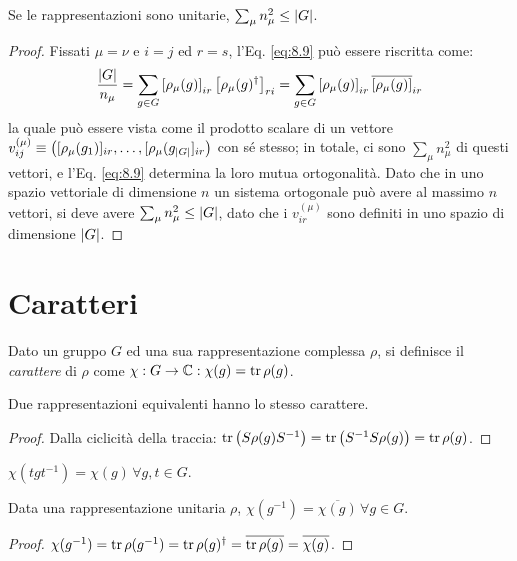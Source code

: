 \begin{corollary}\label{cond-n-mu}
	Se le rappresentazioni sono unitarie, $ \sum_{\mu} n_{\mu}^2 \le \left\lvert G\right\rvert $.
\end{corollary}
\begin{proof}
	Fissati $ \mu = \nu $ e $ i = j $ ed $ r = s $, l'Eq. \ref{eq:8.9} può essere riscritta come:
	\begin{equation*}
		\frac{\left\lvert G\right\rvert}{n_{\mu}} = \sum_{g \in G} \left[ \rho_{\mu}(g) \right]_{ir} \left[ \rho_{\mu}(g)^{\dagger} \right]_{ri} = \sum_{g \in G} \left[ \rho_{\mu}(g) \right]_{ir} \overline{\left[ \rho_{\mu}(g) \right]}_{ir}
	\end{equation*}
	la quale può essere vista come il prodotto scalare di un vettore $ v^{(\mu)}_{ij} \equiv \left( [\rho_{\mu}(g_1)]_{ir}, \dots, [\rho_{\mu}(g_{\left\lvert G\right\rvert}]_{ir} \right) $ con sé stesso; in totale, ci sono $ \sum_{\mu} n_{\mu}^2 $ di questi vettori, e l'Eq. \ref{eq:8.9} determina la loro mutua ortogonalità. Dato che in uno spazio vettoriale di dimensione $ n $ un sistema ortogonale può avere al massimo $ n $ vettori, si deve avere $ \sum_{\mu} n_{\mu}^2 \le \left\lvert G\right\rvert $, dato che i $ v^{(\mu)}_{ir} $ sono definiti in uno spazio di dimensione $ \left\lvert G\right\rvert $.
\end{proof}

\section{Caratteri}

\begin{definition}
	Dato un gruppo $ G $ ed una sua rappresentazione complessa $ \rho $, si definisce il \textit{carattere} di $ \rho $ come $ \chi : G \rightarrow \mathbb{C} : \chi(g) = \operatorname{tr}{\rho(g)} $.
\end{definition}

\begin{proposition}
	Due rappresentazioni equivalenti hanno lo stesso carattere.
\end{proposition}
\begin{proof}
	Dalla ciclicità della traccia: $ \operatorname{tr} \left( S \rho(g) S^{-1} \right) = \operatorname{tr} \left( S^{-1} S \rho(g) \right) = \operatorname{tr} \rho(g) $.
\end{proof}

\begin{propcorollary}\label{cahr-con}
	$ \chi(tgt^{-1}) = \chi(g) \,\forall g,t \in G $.
\end{propcorollary}

\begin{proposition}\label{char-herm}
	Data una rappresentazione unitaria $ \rho $, $ \chi(g^{-1}) = \overline{\chi(g)}\,\forall g \in G $.
\end{proposition}
\begin{proof}
	$ \chi(g^{-1}) = \operatorname{tr} \rho(g^{-1}) = \operatorname{tr} \rho(g)^{\dagger} = \overline{\operatorname{tr} \rho(g)} = \overline{\chi(g)} $.
\end{proof}

